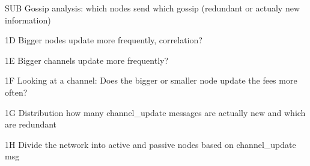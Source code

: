 SUB Gossip analysis: which nodes send which gossip (redundant or actualy new information)
\item 1D Bigger nodes update more frequently, correlation?
\item 1E Bigger channels update more frequently?
\item 1F Looking at a channel: Does the bigger or smaller node update the fees more often?

\item 1G Distribution how many channel_update messages are actually new and which are redundant
\item 1H Divide the network into active and passive nodes based on channel_update msg
\fi